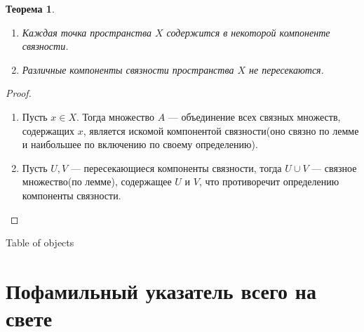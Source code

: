 \documentclass[a4paper,100pt]{article}
\theoremstyle{indented}
\newtheorem{theorem}{Теорема}
\begin{document}
    \begin{theorem}
        \begin{enumerate}
            \item Каждая точка пространства $X$ содержится в некоторой компоненте связности.
            \item Различные компоненты связности пространства $X$ не пересекаются.
        \end{enumerate}
    \end{theorem}
    
    \begin{proof} \textcolor{white}{-}\\
    \begin{enumerate}
        \item Пусть $x \in X$. Тогда множество $A$ --- объединение всех связных множеств, содержащих $x$, является искомой компонентой связности(оно связно по лемме и наибольшее по включению по своему определению).
        \item Пусть $U,V$ --- пересекающиеся компоненты связности, тогда $U \cup V$ --- связное множество(по лемме), содержащее $U$ и $V$, что противоречит определению компоненты связности.
    \end{enumerate}
    \end{proof}



\newpage

\hypertarget{t2}{Table of objects}



\section{Пофамильный указатель всего на свете}
\end{document}
